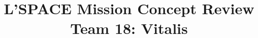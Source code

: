 \documentclass[12pt]{article}
\begin{document}
\title{L'SPACE Mission Concept Review\\\large Team 18: Vitalis}
\author{}
\date{}

\maketitle 




\clearpage

\tableofcontents
\clearpage

\listoffigures
\clearpage


\clearpage













\clearpage



\clearpage

\clearpage

\end{document}
